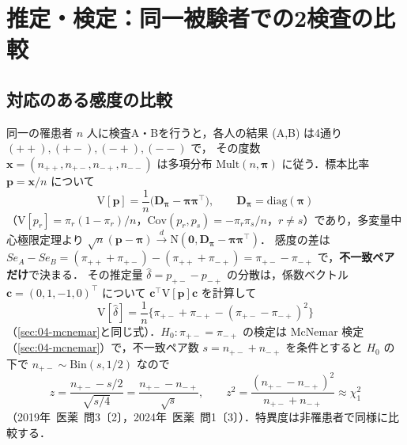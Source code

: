 \documentclass[a4paper,11pt,openany]{ltjsbook}
\newcommand{\tagbox}[2]{\tcbox[on line,boxsep=0.5pt,left=2pt,right=2pt,top=0.5pt,bottom=0.5pt,
  colframe=#1,colback=#1!10,boxrule=0.4pt,arc=1pt]{\scriptsize\bfseries\textcolor{#1}{#2}}}
\newcommand{\Hinshutsu}{\tagbox{bkorange}{頻出}}
\newcommand{\kakomon}[2]{\mbox{#1年 医薬 問#2}}
\newcommand{\V}{\mathrm{V}}
\newcommand{\Cov}{\mathrm{Cov}}
\newcommand{\Normal}{\mathrm{N}}
\newcommand{\Bin}{\mathrm{Bin}}
\newcommand{\transp}{^{\top}}
\begin{document}
\section{推定・検定：同一被験者での2検査の比較}\label{sec:05-compare}
\subsection{対応のある感度の比較}\label{subsec:05-sens}
\Hinshutsu 同一の罹患者 $n$ 人に検査A・Bを行うと，各人の結果 (A,B) は4通り $(++),(+-),(-+),(--)$ で，
その度数 $\bm x=(n_{++},n_{+-},n_{-+},n_{--})$ は多項分布 $\mathrm{Mult}(n,\bm\pi)$ に従う．標本比率 $\bm p=\bm x/n$ について
\begin{equation}
\V[\bm p]=\frac1n\bigl(\bm D_{\bm\pi}-\bm\pi\bm\pi\transp\bigr),\qquad \bm D_{\bm\pi}=\mathrm{diag}(\bm\pi)\label{eq:05-multcov}
\end{equation}
（$\V[p_r]=\pi_r(1-\pi_r)/n$，$\Cov(p_r,p_s)=-\pi_r\pi_s/n$，$r\ne s$）であり，多変量中心極限定理より $\sqrt n(\bm p-\bm\pi)\xrightarrow{d}\Normal(\bm0,\bm D_{\bm\pi}-\bm\pi\bm\pi\transp)$．
感度の差は $Se_A-Se_B=(\pi_{++}+\pi_{+-})-(\pi_{++}+\pi_{-+})=\pi_{+-}-\pi_{-+}$ で，\textbf{不一致ペアだけ}で決まる．
その推定量 $\hat\delta=p_{+-}-p_{-+}$ の分散は，係数ベクトル $\bm c=(0,1,-1,0)\transp$ について $\bm c\transp\V[\bm p]\bm c$ を計算して
\begin{equation}
\V[\hat\delta]=\frac1n\bigl\{\pi_{+-}+\pi_{-+}-(\pi_{+-}-\pi_{-+})^2\bigr\}\label{eq:05-sensvar}
\end{equation}
（\cref{sec:04-mcnemar}と同じ式）．$H_0:\pi_{+-}=\pi_{-+}$ の検定は McNemar 検定（\cref{sec:04-mcnemar}）で，不一致ペア数 $s=n_{+-}+n_{-+}$ を条件とすると
$H_0$ の下で $n_{+-}\sim\Bin(s,1/2)$ なので
\[
z=\frac{n_{+-}-s/2}{\sqrt{s/4}}=\frac{n_{+-}-n_{-+}}{\sqrt{s}},\qquad z^2=\frac{(n_{+-}-n_{-+})^2}{n_{+-}+n_{-+}}\approx\chi^2_1
\]
（\kakomon{2019}{3}〔2〕，\kakomon{2024}{1}〔3〕）．特異度は非罹患者で同様に比較する．
\end{document}
